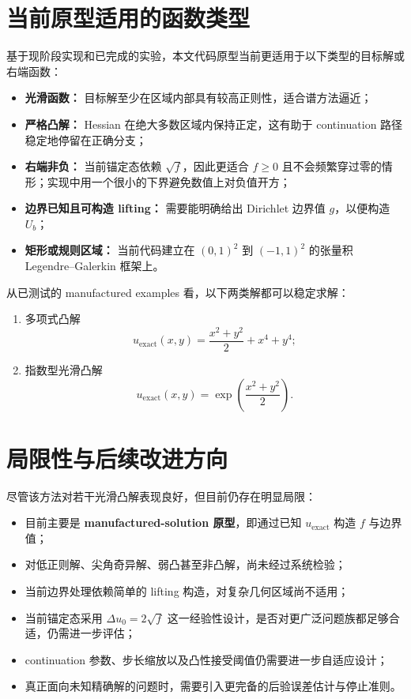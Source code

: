 \documentclass[11pt,a4paper]{article}
\begin{document}
\section{当前原型适用的函数类型}
基于现阶段实现和已完成的实验，本文代码原型当前更适用于以下类型的目标解或右端函数：
\begin{itemize}[leftmargin=2em]
\item \textbf{光滑函数：} 目标解至少在区域内部具有较高正则性，适合谱方法逼近；
\item \textbf{严格凸解：} Hessian 在绝大多数区域内保持正定，这有助于 continuation 路径稳定地停留在正确分支；
\item \textbf{右端非负：} 当前锚定态依赖 $\sqrt{f}$，因此更适合 $f\ge 0$ 且不会频繁穿过零的情形；实现中用一个很小的下界避免数值上对负值开方；
\item \textbf{边界已知且可构造 lifting：} 需要能明确给出 Dirichlet 边界值 $g$，以便构造 $U_b$；
\item \textbf{矩形或规则区域：} 当前代码建立在 $(0,1)^2$ 到 $(-1,1)^2$ 的张量积 Legendre--Galerkin 框架上。
\end{itemize}

从已测试的 manufactured examples 看，以下两类解都可以稳定求解：
\begin{enumerate}[leftmargin=2em]
\item 多项式凸解
\[
u_{\mathrm{exact}}(x,y)=\frac{x^2+y^2}{2}+x^4+y^4;
\]
\item 指数型光滑凸解
\[
u_{\mathrm{exact}}(x,y)=\exp\!\left(\frac{x^2+y^2}{2}\right).
\]
\end{enumerate}

\section{局限性与后续改进方向}
尽管该方法对若干光滑凸解表现良好，但目前仍存在明显局限：
\begin{itemize}[leftmargin=2em]
\item 目前主要是 \textbf{manufactured-solution 原型}，即通过已知 $u_{\mathrm{exact}}$ 构造 $f$ 与边界值；
\item 对低正则解、尖角奇异解、弱凸甚至非凸解，尚未经过系统检验；
\item 当前边界处理依赖简单的 lifting 构造，对复杂几何区域尚不适用；
\item 当前锚定态采用 $\Delta u_0=2\sqrt{f}$ 这一经验性设计，是否对更广泛问题族都足够合适，仍需进一步评估；
\item continuation 参数、步长缩放以及凸性接受阈值仍需要进一步自适应设计；
\item 真正面向未知精确解的问题时，需要引入更完备的后验误差估计与停止准则。
\end{itemize}
\end{document}
